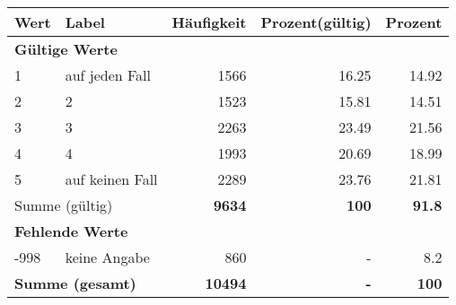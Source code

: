      \begin{longtable}{lXrrr}
     \toprule
     \textbf{Wert} & \textbf{Label} & \textbf{Häufigkeit} & \textbf{Prozent(gültig)} & \textbf{Prozent} \\
     \endhead
     \midrule
     \multicolumn{5}{l}{\textbf{Gültige Werte}}\\

     1 &
     \multicolumn{1}{X}{ auf jeden Fall   } &


       \num{1566} &
       \num[round-mode=places,round-precision=2]{16.25} &
         \num[round-mode=places,round-precision=2]{14.92} \\

     2 &
     \multicolumn{1}{X}{ 2   } &


       \num{1523} &
       \num[round-mode=places,round-precision=2]{15.81} &
         \num[round-mode=places,round-precision=2]{14.51} \\

     3 &
     \multicolumn{1}{X}{ 3   } &


       \num{2263} &
       \num[round-mode=places,round-precision=2]{23.49} &
         \num[round-mode=places,round-precision=2]{21.56} \\

     4 &
     \multicolumn{1}{X}{ 4   } &


       \num{1993} &
       \num[round-mode=places,round-precision=2]{20.69} &
         \num[round-mode=places,round-precision=2]{18.99} \\

     5 &
     \multicolumn{1}{X}{ auf keinen Fall   } &


       \num{2289} &
       \num[round-mode=places,round-precision=2]{23.76} &
         \num[round-mode=places,round-precision=2]{21.81} \\
     \midrule
     \multicolumn{2}{l}{Summe (gültig)} &
       \textbf{\num{9634}} &
     \textbf{\num{100}} &
       \textbf{\num[round-mode=places,round-precision=2]{91.8}} \\
     \multicolumn{5}{l}{\textbf{Fehlende Werte}}\\
       -998 &
       keine Angabe &
         \num{860} &
        - &
         \num[round-mode=places,round-precision=2]{8.2} \\
     \midrule
     \multicolumn{2}{l}{\textbf{Summe (gesamt)}} &
          \textbf{\num{10494}} &
        \textbf{-} &
        \textbf{\num{100}} \\
     \bottomrule
     \end{longtable}
     
